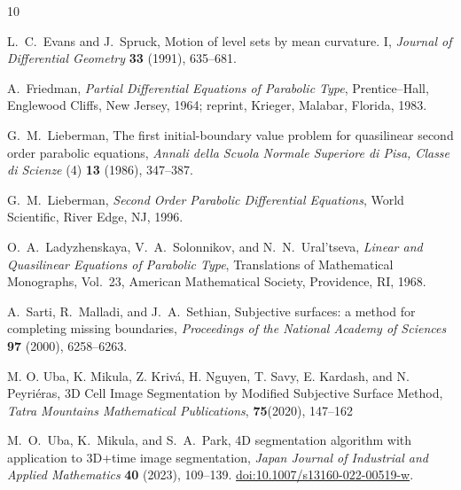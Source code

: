 \documentclass[11pt]{article}
\theoremstyle{remark}
\begin{document}
\begin{thebibliography}{10}

L.~C.~Evans and J.~Spruck, Motion of level sets by mean curvature. I,
\emph{Journal of Differential Geometry} \textbf{33} (1991), 635--681.

A.~Friedman, \emph{Partial Differential Equations of Parabolic Type}, Prentice--Hall,
Englewood Cliffs, New Jersey, 1964; reprint, Krieger, Malabar, Florida, 1983.


G.~M.~Lieberman, The first initial-boundary value problem for quasilinear second order
parabolic equations, \emph{Annali della Scuola Normale Superiore di Pisa, Classe di Scienze}
(4) \textbf{13} (1986), 347--387.

G.~M.~Lieberman, \emph{Second Order Parabolic Differential Equations}, World Scientific,
River Edge, NJ, 1996.

O.~A.~Ladyzhenskaya, V.~A.~Solonnikov, and N.~N.~Ural'tseva,
\emph{Linear and Quasilinear Equations of Parabolic Type}, Translations of Mathematical
Monographs, Vol.~23, American Mathematical Society, Providence, RI, 1968.

A.~Sarti, R.~Malladi, and J.~A.~Sethian, Subjective surfaces: a method for completing missing
boundaries, \emph{Proceedings of the National Academy of Sciences} \textbf{97} (2000), 6258--6263.

{M. O. Uba}, K. Mikula, Z. Kriv\'{a}, H. Nguyen, T. Savy, E. Kardash, and N. Peyri\'{e}ras,
{3D Cell Image Segmentation by Modified Subjective Surface Method,}
{\it Tatra Mountains Mathematical Publications}, {\bf 75}(2020), 147–162

M.~O.~Uba, K.~Mikula, and S.~A.~Park, 4D segmentation algorithm with application to 3D+time
image segmentation, \emph{Japan Journal of Industrial and Applied Mathematics} \textbf{40}
(2023), 109--139. \href{https://doi.org/10.1007/s13160-022-00519-w}{doi:10.1007/s13160-022-00519-w}.

\end{thebibliography}
\end{document}
